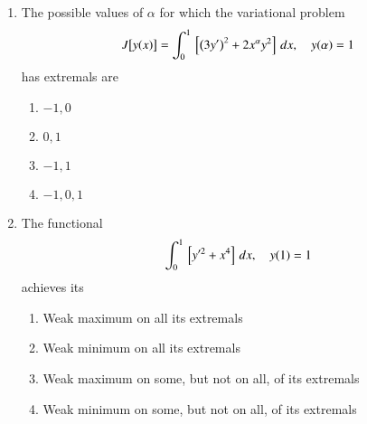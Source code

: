 \documentclass[journal,12pt,onecolumn]{IEEEtran}
\theoremstyle{remark}
\begin{document}
\begin{enumerate}
\item The possible values of $\alpha$ for which the variational problem  
\[
J\big[ y(x) \big] = \int_0^1 {}\left[ \left(3y'\right)^2 + 2x^\alpha y^2 \right] \, dx, \quad y(\alpha) = 1
\]
has extremals are  
\\[-0.3em]\makebox[\textwidth][r]{\textit{[GATE EE 2025]}}

\begin{enumerate}[label=(\Alph*)]
\item $-1, 0$
\item $0, 1$
\item $-1, 1$
\item $-1, 0, 1$
\end{enumerate}

\item The functional  
\[
\int_0^1 {}\left[ y'^2 + x^4 \right] \, dx, \quad y(1) = 1
\]
achieves its  
\\[-0.3em]\makebox[\textwidth][r]{\textit{[GATE EE 2025]}}

\begin{enumerate}[label=(\Alph*)]
\item Weak maximum on all its extremals
\item Weak minimum on all its extremals
\item Weak maximum on some, but not on all, of its extremals
\item Weak minimum on some, but not on all, of its extremals
\end{enumerate}

\end{enumerate}
\end{document}
